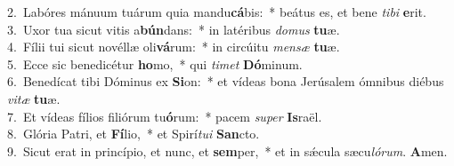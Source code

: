 {2.~}Labóres mánuum tuárum quia mandu\textbf{cá}bis:~* beátus es, et bene \textit{ti}\textit{bi} \textbf{e}rit.\\
{3.~}Uxor tua sicut vitis a\textbf{bún}dans:~* in latéribus \textit{do}\textit{mus} \textbf{tu}æ.\\
{4.~}Fílii tui sicut novéllæ oli\textbf{vá}rum:~* in circúitu \textit{men}\textit{sæ} \textbf{tu}æ.\\
{5.~}Ecce sic benedicétur \textbf{ho}mo,~* qui \textit{ti}\textit{met} \textbf{Dó}minum.\\
{6.~}Benedícat tibi Dóminus ex \textbf{Si}on:~* et vídeas bona Jerúsalem ómnibus diébus \textit{vi}\textit{tæ} \textbf{tu}æ.\\
{7.~}Et vídeas fílios filiórum tu\textbf{ó}rum:~* pacem \textit{su}\textit{per} \textbf{Is}raël.\\
{8.~}Glória Patri, et \textbf{Fí}lio,~* et Spirí\textit{tu}\textit{i} \textbf{San}cto.\\
{9.~}Sicut erat in princípio, et nunc, et \textbf{sem}per,~* et in sǽcula sæcu\textit{ló}\textit{rum}. \textbf{A}men.\\
